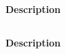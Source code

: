 \paragraph{Description} \descriptifFG

\subsection{\formationH}
\paragraph{Description} \descriptifFH

